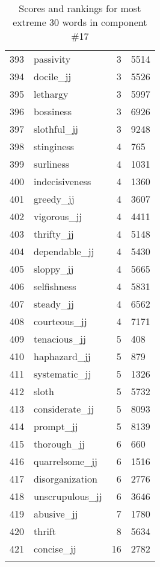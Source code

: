 \begin{longtable}[!htbp]{| rlr@{.}l |}
    393 & passivity & 3 & 5514 \\
    394 & docile\_jj & 3 & 5526 \\
    395 & lethargy & 3 & 5997 \\
    396 & bossiness & 3 & 6926 \\
    397 & slothful\_jj & 3 & 9248 \\
    398 & stinginess & 4 & 765 \\
    399 & surliness & 4 & 1031 \\
    400 & indecisiveness & 4 & 1360 \\
    401 & greedy\_jj & 4 & 3607 \\
    402 & vigorous\_jj & 4 & 4411 \\
    403 & thrifty\_jj & 4 & 5148 \\
    404 & dependable\_jj & 4 & 5430 \\
    405 & sloppy\_jj & 4 & 5665 \\
    406 & selfishness & 4 & 5831 \\
    407 & steady\_jj & 4 & 6562 \\
    408 & courteous\_jj & 4 & 7171 \\
    409 & tenacious\_jj & 5 & 408 \\
    410 & haphazard\_jj & 5 & 879 \\
    411 & systematic\_jj & 5 & 1326 \\
    412 & sloth & 5 & 5732 \\
    413 & considerate\_jj & 5 & 8093 \\
    414 & prompt\_jj & 5 & 8139 \\
    415 & thorough\_jj & 6 & 660 \\
    416 & quarrelsome\_jj & 6 & 1516 \\
    417 & disorganization & 6 & 2776 \\
    418 & unscrupulous\_jj & 6 & 3646 \\
    419 & abusive\_jj & 7 & 1780 \\
    420 & thrift & 8 & 5634 \\
    421 & concise\_jj & 16 & 2782 \\
    \hline
    \caption{Scores and rankings for most extreme 30 words in component \#17} \\
\end{longtable}
